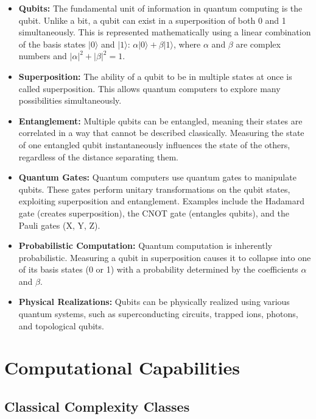 \documentclass{report}
\begin{document}
\begin{itemize}
    \item \textbf{Qubits:} The fundamental unit of information in quantum computing is the qubit.  Unlike a bit, a qubit can exist in a superposition of both 0 and 1 simultaneously.  This is represented mathematically using a linear combination of the basis states \(|0\rangle\) and \(|1\rangle\): \(\alpha|0\rangle + \beta|1\rangle\), where \(\alpha\) and \(\beta\) are complex numbers and \(|\alpha|^2 + |\beta|^2 = 1\).
    \item \textbf{Superposition:} The ability of a qubit to be in multiple states at once is called superposition.  This allows quantum computers to explore many possibilities simultaneously.
    \item \textbf{Entanglement:}  Multiple qubits can be entangled, meaning their states are correlated in a way that cannot be described classically.  Measuring the state of one entangled qubit instantaneously influences the state of the others, regardless of the distance separating them.
    \item \textbf{Quantum Gates:} Quantum computers use quantum gates to manipulate qubits.  These gates perform unitary transformations on the qubit states, exploiting superposition and entanglement.  Examples include the Hadamard gate (creates superposition), the CNOT gate (entangles qubits), and the Pauli gates (X, Y, Z).
    \item \textbf{Probabilistic Computation:} Quantum computation is inherently probabilistic.  Measuring a qubit in superposition causes it to collapse into one of its basis states (0 or 1) with a probability determined by the coefficients \(\alpha\) and \(\beta\).
    \item \textbf{Physical Realizations:} Qubits can be physically realized using various quantum systems, such as superconducting circuits, trapped ions, photons, and topological qubits.
\end{itemize}

\section{Computational Capabilities}
\label{sec:computational-capabilities}

\subsection{Classical Complexity Classes}
\label{subsec:classical-complexity}
\end{document}
